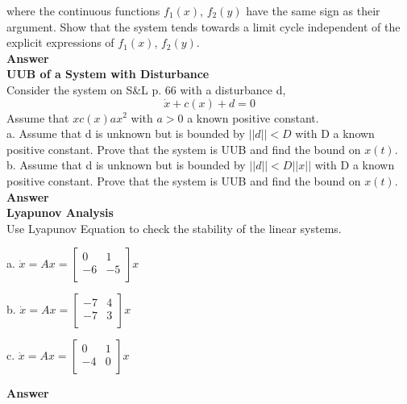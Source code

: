 \documentclass{homeworg}
\begin{document}
where the continuous functions \(f_1 (x)\), \(f_2 (y)\) have the same sign as
their argument. Show that the system tends towards a limit cycle independent of the explicit expressions of \(f_1 (x)\), \(f_2 (y)\).\\

\noindent
\textbf{Answer} \\



\exercise
\noindent
\textbf{UUB of a System with Disturbance}\\
Consider the system on S\&L p. 66 with a disturbance d,
\begin{equation*}
  \dot{x} + c(x) + d = 0
\end{equation*}
Assume that \(xc(x) a x^2 \) with \( a > 0\) a known positive constant.\\
a. Assume that d is unknown but is bounded by \(||d|| < D \) with D a known positive constant. Prove that the system is UUB and find the bound on \(x(t)\).\\
b. Assume that d is unknown but is bounded by \(||d|| < D||x|| \) with D a known positive constant. Prove that the system is UUB and find the bound on \(x(t)\).\\

\noindent
\textbf{Answer} \\

\exercise
\noindent
\textbf{Lyapunov Analysis}\\
Use Lyapunov Equation to check the stability of the linear systems.

a. \( \dot{x} = Ax = \begin{bmatrix}
  0 & 1\\
  -6 & -5\\
\end{bmatrix} x \)

b. \( \dot{x} = Ax = \begin{bmatrix}
  -7 & 4\\
  -7 & 3\\
\end{bmatrix} x \)

c. \( \dot{x} = Ax = \begin{bmatrix}
   0 & 1\\
  -4 & 0\\
\end{bmatrix} x \)

\noindent
\textbf{Answer} \\
\end{document}
